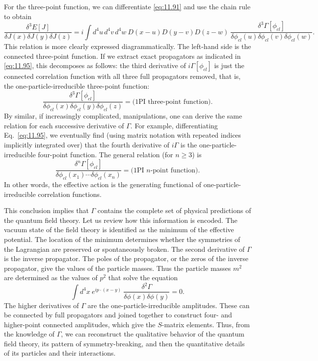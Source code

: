 For the three-point function, we can differentiate \eqref{eq:11.91} and use
the chain rule to obtain
\begin{equation}
  \frac{\delta^3 E[J]}{\delta J(x)\delta J(y)\delta J(z)}
  = i\int d^4u\,d^4v\,d^4w\ D(x-u)D(y-v)D(z-w)\
    \frac{\delta^3\Gamma[\phi_{cl}]}
      {\delta\phi_{cl}(u)\delta\phi_{cl}(v)\delta\phi_{cl}(w)} .
  \label{eq:11.95}
\end{equation}
This relation is more clearly expressed diagrammatically.  The left-hand side
is the connected three-point function.  If we extract exact propagators as
indicated in \eqref{eq:11.95}, this decomposes as follows: the third
derivative of $i\Gamma[\phi_{cl}]$ is just the connected correlation function
with all three full propagators removed, that is, the
one-particle-irreducible three-point function:
\begin{equation}
  \frac{\delta^3\Gamma[\phi_{cl}]}{\delta\phi_{cl}(x)\delta\phi_{cl}(y)
    \delta\phi_{cl}(z)} = \text{(1PI three-point function)} .
\end{equation}
By similar, if increasingly complicated, manipulations, one can derive the
same relation for each successive derivative of $\Gamma$.  For example,
differentiating Eq.~\eqref{eq:11.95}, we eventually find (using matrix
notation with repeated indices implicitly integrated over) that the fourth
derivative of $i\Gamma$ is the one-particle-irreducible four-point function.
The general relation (for $n \ge 3$) is
\begin{equation}
  \frac{\delta^n\Gamma[\phi_{cl}]}{\delta\phi_{cl}(x_1)\cdots
    \delta\phi_{cl}(x_n)} = \text{(1PI } n\text{-point function)} .
  \label{eq:11.96}
\end{equation}
In other words, the effective action is the generating functional of
one-particle-irreducible correlation functions.

This conclusion implies that $\Gamma$ contains the complete set of physical
predictions of the quantum field theory.  Let us review how this information
is encoded.  The vacuum state of the field theory is identified as the minimum
of the effective potential.  The location of the minimum determines whether
the symmetries of the Lagrangian are preserved or spontaneously broken.  The
second derivative of $\Gamma$ is the inverse propagator.  The poles of the
propagator, or the zeros of the inverse propagator, give the values of the
particle masses.  Thus the particle masses $m^2$ are determined as the values
of $p^2$ that solve the equation
\begin{equation}
  \int d^4x\ e^{ip\cdot(x-y)}\ \frac{\delta^2\Gamma}{\delta\phi(x)
    \delta\phi(y)} = 0 .
  \label{eq:11.97}
\end{equation}
The higher derivatives of $\Gamma$ are the one-particle-irreducible
amplitudes.  These can be connected by full propagators and joined together to
construct four- and higher-point connected amplitudes, which give the
$S$-matrix elements.  Thus, from the knowledge of $\Gamma$, we can reconstruct
the qualitative behavior of the quantum field theory, its pattern of
symmetry-breaking, and then the quantitative details of its particles and
their interactions.

